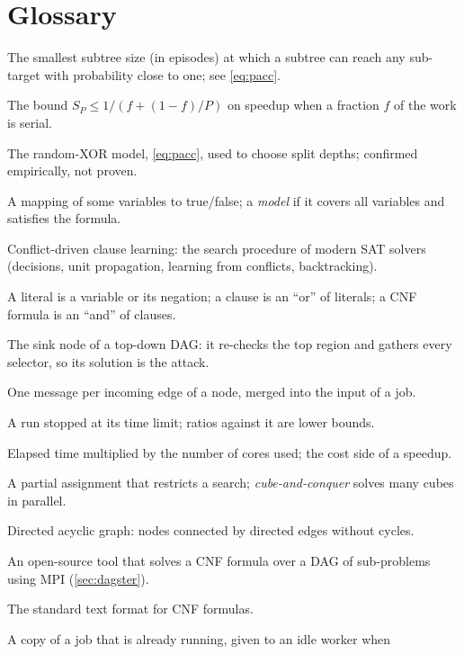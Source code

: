 \documentclass[11pt,a4paper]{article}
\begin{document}
\section{Glossary}
\label{app:glossary}
\begin{description}[style=nextline, leftmargin=1.5em, font=\normalfont\bfseries]
\item[Acceptance floor] The smallest subtree size (in episodes) at which a subtree can
  reach any sub-target with probability close to one; see \cref{eq:pacc}.
\item[Amdahl's law] The bound $S_P\le 1/(f+(1-f)/P)$ on speedup when a fraction $f$ of the
  work is serial.
\item[Acceptance predictor] The random-XOR model, \cref{eq:pacc}, used to choose split depths;
  confirmed empirically, not proven.
\item[Assignment] A mapping of some variables to true/false; a \emph{model} if it covers
  all variables and satisfies the formula.
\item[CDCL] Conflict-driven clause learning: the search procedure of modern SAT solvers
  (decisions, unit propagation, learning from conflicts, backtracking).
\item[Clause / literal / CNF] A literal is a variable or its negation; a clause is an
  ``or'' of literals; a CNF formula is an ``and'' of clauses.
\item[Collector] The sink node of a top-down DAG: it re-checks the top region and gathers
  every selector, so its solution is the attack.
\item[Combination] One message per incoming edge of a node, merged into the input of a job.
\item[Censored run] A run stopped at its time limit; ratios against it are lower bounds.
\item[Core-seconds] Elapsed time multiplied by the number of cores used; the cost side of a
  speedup.
\item[Cube] A partial assignment that restricts a search; \emph{cube-and-conquer} solves
  many cubes in parallel.
\item[DAG] Directed acyclic graph: nodes connected by directed edges without cycles.
\item[Dagster] An open-source tool that solves a CNF formula over a DAG of sub-problems
  using MPI (\cref{sec:dagster}).
\item[DIMACS] The standard text format for CNF formulas.
\item[Duplicate job] A copy of a job that is already running, given to an idle worker when

\end{description}
\end{document}
